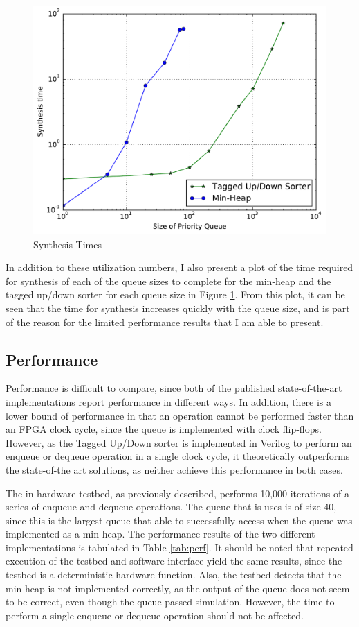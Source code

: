 \begin{figure}[t!]
	\centering
	\includegraphics[width=\columnwidth]{data/synthesis_times.pdf}
	\caption{Synthesis Times}
	\label{fig:synth_times}
\end{figure}

In addition to these utilization numbers, I also present a plot of the time required for synthesis of each of the queue sizes to complete for the min-heap and the tagged up/down sorter for each queue size in Figure \ref{fig:synth_times}. From this plot, it can be seen that the time for synthesis increases quickly with the queue size, and is part of the reason for the limited performance results that I am able to present.

\subsection{Performance}
Performance is difficult to compare, since both of the published state-of-the-art implementations report performance in different ways. In addition, there is a lower bound of performance in that an operation cannot be performed faster than an FPGA clock cycle, since the queue is implemented with clock flip-flops. However, as the Tagged Up/Down sorter is implemented in Verilog to perform an enqueue or dequeue operation in a single clock cycle, it theoretically outperforms the state-of-the art solutions, as neither achieve this performance in both cases.

The in-hardware testbed, as previously described, performs 10,000 iterations of a series of enqueue and dequeue operations. The queue that is uses is of size 40, since this is the largest queue that able to successfully access when the queue was implemented as a min-heap. The performance results of the two different implementations is tabulated in Table \ref{tab:perf}. It should be noted that repeated execution of the testbed and software interface yield the same results, since the testbed is a deterministic hardware function. Also, the testbed detects that the min-heap is not implemented correctly, as the output of the queue does not seem to be correct, even though the queue passed simulation. However, the time to perform a single enqueue or dequeue operation should not be affected.

